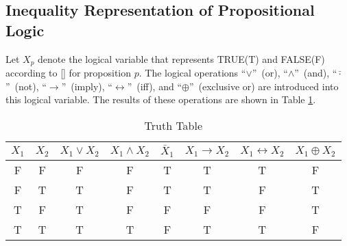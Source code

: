 \documentclass[]{interact}
\theoremstyle{plain}%
\theoremstyle{definition}
\theoremstyle{remark}
\begin{document}
\subsection{Inequality Representation of Propositional Logic}
Let $X_p$ denote the logical variable that represents TRUE(T) and FALSE(F) according to [] for proposition $p$. 
The logical operations ``$\vee$''~(or), ``$\wedge$''~(and), ``$\bar{\cdot}$''~(not), ``$\rightarrow$''~(imply), ``$\leftrightarrow$''~(iff), and ``$\oplus$''~(exclusive or) are introduced into this logical variable. 
The results of these operations are shown in Table \ref{table:Truth Table}.
\begin{table}[hbtp]
    \caption{Truth Table}
    \label{table:Truth Table}
    \centering
    \begin{tabular}{|c|c||c|c|c|c|c|c|}
      \hline
      $X_1$ & $X_2$ & $X_1\vee X_2$ & $X_1\wedge X_2$ & $\bar{X}_1$ & $X_1\rightarrow X_2$ & $X_1\leftrightarrow X_2$ & $X_1\oplus X_2$ \\
      \hline \hline
        F  & F  & F & F & T & T & T & F\\
        F  & T  & T & F & T & T & F & T\\
        T  & F  & T & F & F & F & F & T\\
        T  & T  & T & T & F & T & T & F\\
      \hline
    \end{tabular}
\end{table}
\end{document}
